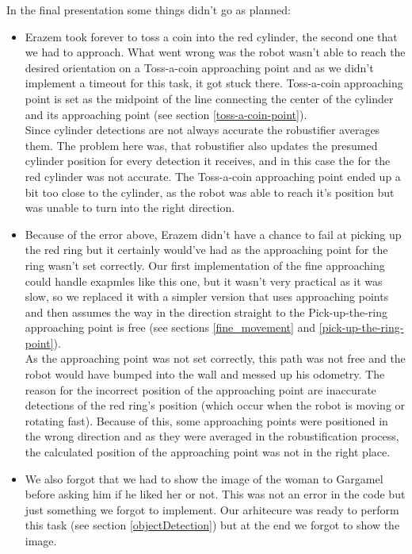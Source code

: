 \documentclass[12pt,a4paper]{article}
\begin{document}
	In the final presentation some things didn't go as planned:
	\begin{itemize}
		\item Erazem took forever to toss a coin into the red cylinder, the second one that we had to approach. What went wrong was the robot wasn't able to reach the desired orientation on a Toss-a-coin approaching point and as we didn't implement a timeout for this task, it got stuck there. Toss-a-coin approaching point is set as the midpoint of the line connecting the center of the cylinder and its approaching point (see section \ref{toss-a-coin-point}). \\
		Since cylinder detections are not always accurate the robustifier averages them. The problem here was, that robustifier also updates the presumed cylinder position for every detection it receives, and in this case the  for the red cylinder was not accurate. The Toss-a-coin approaching point ended up a bit too close to the cylinder, as the robot was able to reach it's position but was unable to turn into the right direction.
		\item Because of the error above, Erazem didn't have a chance to fail at picking up the red ring but it certainly would've had as the approaching point for the ring wasn't set correctly. Our first implementation of the fine approaching could handle exapmles like this one, but it wasn't very practical as it was slow, so we replaced it with a simpler version that uses approaching points and then assumes the way in the direction straight to the Pick-up-the-ring approaching point is free (see sections \ref{fine_movement} and \ref{pick-up-the-ring-point}). \\
		As the approaching point was not set correctly, this path was not free and the robot would have bumped into the wall and messed up his odometry. The reason for the incorrect position of the approaching point are inaccurate detections of the red ring's position (which occur when the robot is moving or rotating fast). Because of this, some approaching points were positioned in the wrong direction and as they were averaged in the robustification process, the calculated position of the approaching point was not in the right place.
		\item We also forgot that we had to show the image of the woman to Gargamel before asking him if he liked her or not. This was not an error in the code but just something we forgot to implement. Our arhitecure was ready to perform this task (see section \ref{objectDetection}) but at the end we forgot to show the image.

\end{itemize}
\end{document}
